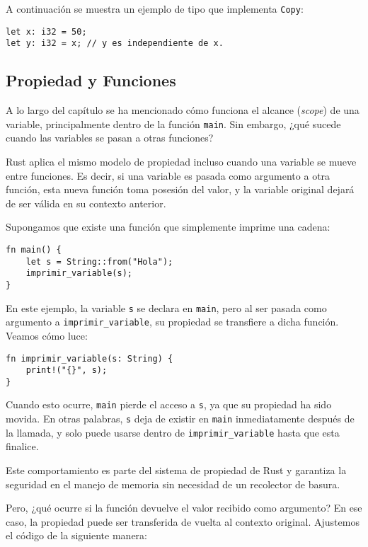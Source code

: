 \documentclass[12pt]{article}
\begin{document}
A continuación se muestra un ejemplo de tipo que implementa \texttt{Copy}:

\begin{lstlisting}[style=ruststyle]
let x: i32 = 50;
let y: i32 = x; // y es independiente de x.
\end{lstlisting}


\subsection{Propiedad y Funciones}

A lo largo del capítulo se ha mencionado cómo funciona el alcance (\textit{scope}) de una variable, principalmente dentro de la función \texttt{main}. Sin embargo, ¿qué sucede cuando las variables se pasan a otras funciones?

Rust aplica el mismo modelo de propiedad incluso cuando una variable se mueve entre funciones. Es decir, si una variable es pasada como argumento a otra función, esta nueva función toma posesión del valor, y la variable original dejará de ser válida en su contexto anterior.

Supongamos que existe una función que simplemente imprime una cadena:

\begin{lstlisting}[style=ruststyle]
fn main() {
	let s = String::from("Hola");
	imprimir_variable(s);
}
\end{lstlisting}

En este ejemplo, la variable \texttt{s} se declara en \texttt{main}, pero al ser pasada como argumento a \texttt{imprimir\_variable}, su propiedad se transfiere a dicha función. Veamos cómo luce:

\begin{lstlisting}[style=ruststyle]
fn imprimir_variable(s: String) {
	print!("{}", s);
}
\end{lstlisting}

Cuando esto ocurre, \texttt{main} pierde el acceso a \texttt{s}, ya que su propiedad ha sido movida. En otras palabras, \texttt{s} deja de existir en \texttt{main} inmediatamente después de la llamada, y solo puede usarse dentro de \texttt{imprimir\_variable} hasta que esta finalice.

Este comportamiento es parte del sistema de propiedad de Rust y garantiza la seguridad en el manejo de memoria sin necesidad de un recolector de basura.

Pero, ¿qué ocurre si la función devuelve el valor recibido como argumento? En ese caso, la propiedad puede ser transferida de vuelta al contexto original. Ajustemos el código de la siguiente manera:
\end{document}

